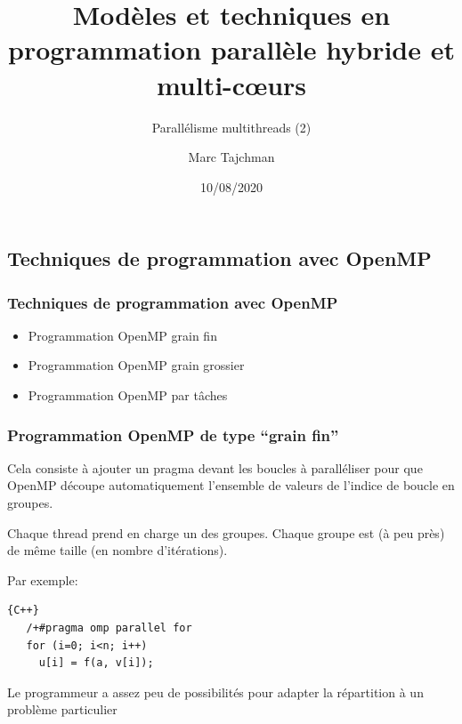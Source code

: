 \documentclass{beamer}
\title{Modèles et techniques en programmation parallèle hybride et multi-c\oe urs}
\subtitle{Parall\'elisme multithreads (2)}
\author{Marc Tajchman}\institute{CEA - DEN/DM2S/STMF/LMES}
\date{10/08/2020}
\begin{document}
\begin{frame}
	\titlepage
\end{frame}

\large
\begin{frame}
	\section{Techniques de programmation avec OpenMP}
	\frametitle{Techniques de programmation avec OpenMP}

\begin{itemize}
	\item Programmation OpenMP grain fin
	\bigskip
	\item Programmation OpenMP grain grossier
	\bigskip
	\item Programmation OpenMP par tâches
\end{itemize}
\end{frame}

\begin{frame}[fragile]
	\frametitle{Programmation OpenMP de type ``grain fin''}
	
	Cela consiste à ajouter un pragma devant les boucles à paralléliser pour que OpenMP découpe automatiquement l'ensemble de valeurs de l'indice de boucle en groupes.
	
	\vfill
	Chaque thread prend en charge un des groupes. Chaque groupe est (à peu près) de même taille (en nombre d'itérations).
	\vfill
	
	Par exemple:
	

\begin{lstlisting}{C++}
   /+#pragma omp parallel for
   for (i=0; i<n; i++)
     u[i] = f(a, v[i]);
\end{lstlisting}
	
		
	\vfill
	Le programmeur a assez peu de possibilités pour adapter la répartition à un problème particulier
\end{frame}
\end{document}
